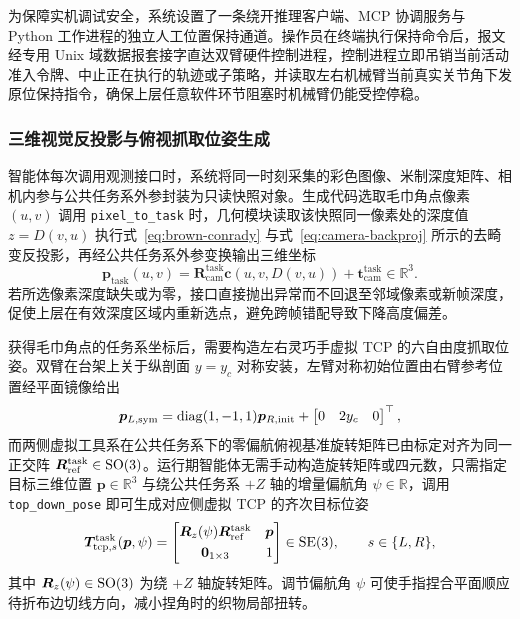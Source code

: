 为保障实机调试安全，系统设置了一条绕开推理客户端、MCP 协调服务与 Python 工作进程的独立人工位置保持通道。操作员在终端执行保持命令后，报文经专用 Unix 域数据报套接字直达双臂硬件控制进程，控制进程立即吊销当前活动准入令牌、中止正在执行的轨迹或子策略，并读取左右机械臂当前真实关节角下发原位保持指令，确保上层任意软件环节阻塞时机械臂仍能受控停稳。

\subsubsection{三维视觉反投影与俯视抓取位姿生成}

智能体每次调用观测接口时，系统将同一时刻采集的彩色图像、米制深度矩阵、相机内参与公共任务系外参封装为只读快照对象。生成代码选取毛巾角点像素 $(u, v)$ 调用 \texttt{pixel\_to\_task} 时，几何模块读取该快照同一像素处的深度值 $z = D(v, u)$ 执行式~\eqref{eq:brown-conrady} 与式~\eqref{eq:camera-backproj} 所示的去畸变反投影，再经公共任务系外参变换输出三维坐标
\begin{equation}
  \bm{p}_{\text{task}}(u, v) = \bm{R}_{\text{cam}}^{\text{task}}\bm{c}\!\left(u, v, D(v, u)\right) + \bm{t}_{\text{cam}}^{\text{task}} \in \mathbb{R}^3.
  \label{eq:agent-pixel-to-task}
\end{equation}
若所选像素深度缺失或为零，接口直接抛出异常而不回退至邻域像素或新帧深度，促使上层在有效深度区域内重新选点，避免跨帧错配导致下降高度偏差。

获得毛巾角点的任务系坐标后，需要构造左右灵巧手虚拟 TCP 的六自由度抓取位姿。双臂在台架上关于纵剖面 $y = y_c$ 对称安装，左臂对称初始位置由右臂参考位置经平面镜像给出
\begin{equation}
  \bm{p}_{L,\text{sym}} = \operatorname{diag}(1, -1, 1)\bm{p}_{R,\text{init}} + \begin{bmatrix} 0 & 2y_c & 0 \end{bmatrix}^{\top},
  \label{eq:bimanual-symmetry}
\end{equation}
而两侧虚拟工具系在公共任务系下的零偏航俯视基准旋转矩阵已由标定对齐为同一正交阵 $\bm{R}_{\text{ref}}^{\text{task}} \in \mathrm{SO}(3)$。运行期智能体无需手动构造旋转矩阵或四元数，只需指定目标三维位置 $\bm{p} \in \mathbb{R}^3$ 与绕公共任务系 $+Z$ 轴的增量偏航角 $\psi \in \mathbb{R}$，调用 \texttt{top\_down\_pose} 即可生成对应侧虚拟 TCP 的齐次目标位姿
\begin{equation}
  \bm{T}_{\text{tcp},s}^{\text{task}}(\bm{p}, \psi) = \begin{bmatrix}
    \bm{R}_z(\psi)\bm{R}_{\text{ref}}^{\text{task}} & \bm{p} \\[3pt]
    \bm{0}_{1\times 3} & 1
  \end{bmatrix} \in \mathrm{SE}(3), \qquad s \in \{L, R\},
  \label{eq:top-down-pose}
\end{equation}
其中 $\bm{R}_z(\psi) \in \mathrm{SO}(3)$ 为绕 $+Z$ 轴旋转矩阵。调节偏航角 $\psi$ 可使手指捏合平面顺应待折布边切线方向，减小捏角时的织物局部扭转。

